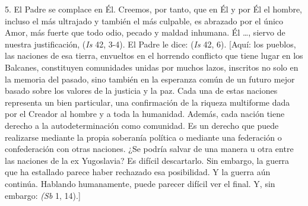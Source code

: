 \begin{body}
	5. El Padre se complace en Él. Creemos, por tanto, que en Él y por Él el hombre, incluso el más ultrajado y también el más culpable, es abrazado por el único Amor, más fuerte que todo odio, pecado y maldad inhumana. Él \ldots{}, siervo de nuestra justificación,  (\emph{Is} 42, 3-4). El Padre le dice:  (\emph{Is} 42, 6). {[}Aquí: los pueblos, las naciones de esa tierra, envueltos en el horrendo conflicto que tiene lugar en los Balcanes, constituyen comunidades unidas por muchos lazos, inscritos no solo en la memoria del pasado, sino también en la esperanza común de un futuro mejor basado sobre los valores de la justicia y la paz. Cada una de estas naciones representa un bien particular, una confirmación de la riqueza multiforme dada por el Creador al hombre y a toda la humanidad. Además, cada nación tiene derecho a la autodeterminación como comunidad. Es un derecho que puede realizarse mediante la propia soberanía política o mediante una federación o confederación con otras naciones. ¿Se podría salvar de una manera u otra entre las naciones de la ex Yugoslavia? Es difícil descartarlo. Sin embargo, la guerra que ha estallado parece haber rechazado esa posibilidad. Y la guerra aún continúa. Hablando humanamente, puede parecer difícil ver el final. Y, sin embargo:  \emph{(Sb} 1, 14).{]}


\end{body}
